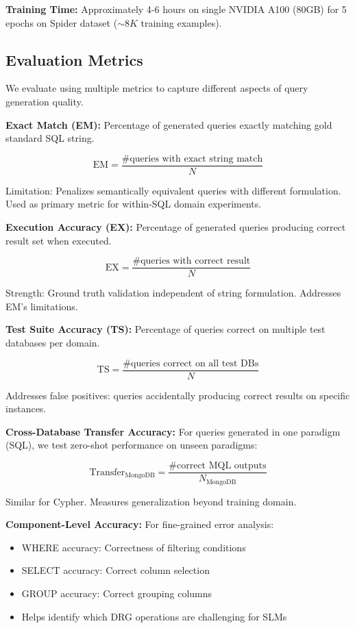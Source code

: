 \documentclass[conference]{IEEEtran}
\begin{document}
\textbf{Training Time:} Approximately 4-6 hours on single NVIDIA A100 (80GB) for 5 epochs on Spider dataset ($\sim 8K$ training examples).

\subsection{Evaluation Metrics}

We evaluate using multiple metrics to capture different aspects of query generation quality.

\textbf{Exact Match (EM):} Percentage of generated queries exactly matching gold standard SQL string.

\[
\text{EM} = \frac{\# \text{queries with exact string match}}{N}
\]

Limitation: Penalizes semantically equivalent queries with different formulation. Used as primary metric for within-SQL domain experiments.

\textbf{Execution Accuracy (EX):} Percentage of generated queries producing correct result set when executed.

\[
\text{EX} = \frac{\# \text{queries with correct result}}{N}
\]

Strength: Ground truth validation independent of string formulation. Addresses EM's limitations.

\textbf{Test Suite Accuracy (TS):} Percentage of queries correct on multiple test databases per domain.

\[
\text{TS} = \frac{\# \text{queries correct on all test DBs}}{N}
\]

Addresses false positives: queries accidentally producing correct results on specific instances.

\textbf{Cross-Database Transfer Accuracy:} For queries generated in one paradigm (SQL), we test zero-shot performance on unseen paradigms:

\[
\text{Transfer}_{\text{MongoDB}} = \frac{\# \text{correct MQL outputs}}{N_{\text{MongoDB}}}
\]

Similar for Cypher. Measures generalization beyond training domain.

\textbf{Component-Level Accuracy:} For fine-grained error analysis:

\begin{itemize}
\item WHERE accuracy: Correctness of filtering conditions
\item SELECT accuracy: Correct column selection
\item GROUP accuracy: Correct grouping columns
\item Helps identify which DRG operations are challenging for SLMs
\end{itemize}
\end{document}
